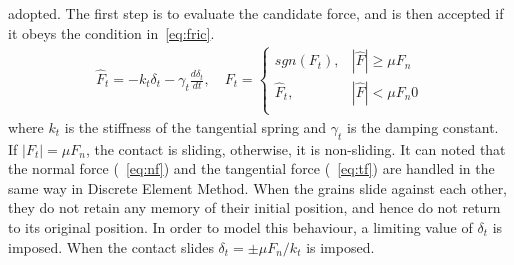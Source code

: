 adopted. The first step is to evaluate the candidate force, and is then 
accepted if it obeys the 
condition in~\cref{eq:fric}.
\begin{align}
 {\hat{F}_{t}}=-{{k}_{t}}{{\delta}_{t}}-{{\gamma}_{t}}\frac{d{{\delta}_{t}}}{dt},
  \quad F_{t}=
\begin{cases}
sgn(F_{t}), & {\left|\hat{F}\right|} \ge \mu F_{n} \\
{\hat{F}}_{t}, & {\left|\hat{F}\right|} < \mu F_{n} 0 \\
\end{cases}
\label{eq:tf}
\end{align} 
where $k_{t}$ is the stiffness of the tangential spring and $\gamma_{t}$ is the 
damping constant. 
If $|F_{t}|=\mu F_{n}$, the contact is sliding, otherwise, it is non-sliding. 
It can noted that 
the 
normal force (~\cref{eq:nf}) and the tangential force (~\cref{eq:tf}) are 
handled in the same 
way in Discrete Element Method. When the grains slide against each other, they 
do not retain any 
memory 
of their initial position, and hence do not return to its original position. In 
order to model 
this 
behaviour, a limiting value of $\delta_{t}$ is imposed. When the contact slides 
$\delta_{t}=\pm\mu 
F_{n}/k_{t}$ is imposed.

